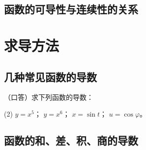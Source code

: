 \subsection{函数的可导性与连续性的关系}
\begin{Practice}

\end{Practice}

\begin{Exercise}
  \begin{question}
    \item 
    \item 
    \item 
    \item 
    \item 
    \item 
    \item 
    \item 
    \item 
    \item 
    \item 
  \end{question}
\end{Exercise}

\section{求导方法}
\subsection{几种常见函数的导数}

\begin{Practice}
  （口答）求下列函数的导数：
  \begin{tasks}(2)
    \task $y=x^5$；
    \task $y=x^6$；
    \task $x=\sin t$；
    \task $u=\cos \varphi$。
  \end{tasks}
\end{Practice}

\subsection{函数的和、差、积、商的导数}
\begin{Practice}
  \begin{question}
    \item 
    \item 
    \item 
    \item 
    \item 
    \item 
  \end{question}
\end{Practice}

